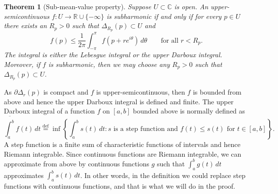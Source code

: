\documentclass[12pt,openany]{book}
\newcommand{\C}{{\mathbb{C}}}
\newcommand{\R}{{\mathbb{R}}}
\theoremstyle{plain}
\newtheorem{thm}{Theorem}[section]
\theoremstyle{remark}
\theoremstyle{definition}
\theoremstyle{exercise}
\theoremstyle{example}
\begin{document}
\begin{thm}[Sub-mean-value property]
\label{thm:submeanprop}
Suppose $U \subset \C$ is open.
An upper-semicontinuous $f \colon U \to \R \cup \{ -\infty \}$
is subharmonic if and only if
for every $p \in U$ there exists an $R_p > 0$ such that
$\Delta_{R_p}(p) \subset U$ and
\begin{equation*}
f(p) \leq \frac{1}{2\pi} \int_{-\pi}^{\pi} f(p+re^{i\theta})\, d\theta
\qquad \text{for all } r < R_p .
\end{equation*}
The integral is either the Lebesgue integral or the upper Darboux integral.
Moreover, if $f$ is subharmonic, then we may choose any
$R_p > 0$ such that $\Delta_{R_p}(p) \subset U$.
\end{thm}

As $\partial \Delta_r(p)$ is compact and $f$ is upper-semicontinuous, then
$f$ is bounded from above and hence the upper Darboux integral is defined
and finite.
The upper Darboux integral of a function $f$ on $[a,b]$ bounded above is normally defined as
\begin{equation*}
\overline{\int_a^b} f(t) \,dt
\overset{\text{def}}{=}
\inf \left\{ \int_a^b s(t) \, dt : s
\text{ is a step function and } f(t) \leq s(t) \text{ for } t \in
[a,b] \right\} .
\end{equation*}
A step function is a finite sum of characteristic functions of intervals and
hence Riemann integrable.
Since continuous functions are Riemann integrable, we can approximate from
above by continuous functions $g$ such that
$\int_a^b g(t)\,dt$
approximates
$\int_a^b s(t)\,dt$.  In other words, in the definition we could replace
step functions with continuous functions, and that is what we will do in
the proof.
\end{document}
